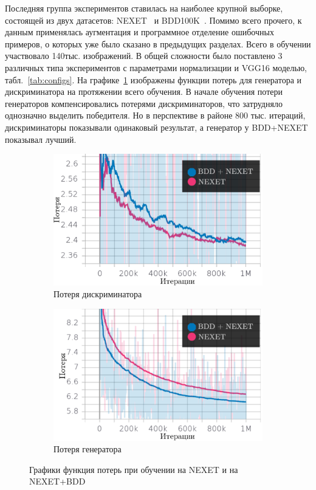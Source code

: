 \documentclass[11pt,a4paper]{extarticle}
\begin{document}
{			Последняя группа экспериментов ставилась на наиболее крупной выборке, состоящей из двух датасетов: NEXET~\cite{data:nexet} и BDD100K~\cite{data:bdd100k}.
			Помимо всего прочего, к данным применялась аугментация и программное отделение ошибочных примеров, о которых уже было сказано в предыдущих разделах.
			Всего в обучении участвовало 140тыс. изображений.
			В общей сложности было поставлено 3 различных типа экспериментов с параметрами нормализации и VGG16 моделью, табл.~\ref{tab:configs}.
			\newline\newline
			На графике~\ref{pic:nexet_bdd} изображены функции потерь для генератора и дискриминатора на протяжении всего обучения.
			В начале обучения потери генераторов компенсировались потерями дискриминаторов, что затрудняло однозначно выделить победителя.
			Но в перспективе в районе 800 тыс. итераций, дискриминаторы показывали одинаковый результат, а генератор у BDD+NEXET показывал лучший.
			
			\begin{figure}[ht]
				\centering
				\begin{subfigure}[ht]{0.45\textwidth}
					\includegraphics[width=\textwidth]{img/nexet_bdd_dis}
					\caption{Потеря дискриминатора}
				\end{subfigure}
				\begin{subfigure}[ht]{0.45\textwidth}
					\includegraphics[width=\textwidth]{img/nexet_bdd_gen}
					\caption{Потеря генератора}
				\end{subfigure}
				\caption{Графики функция потерь при обучении на NEXET и на NEXET+BDD}
				\label{pic:nexet_bdd}
			\end{figure}

}
\end{document}
